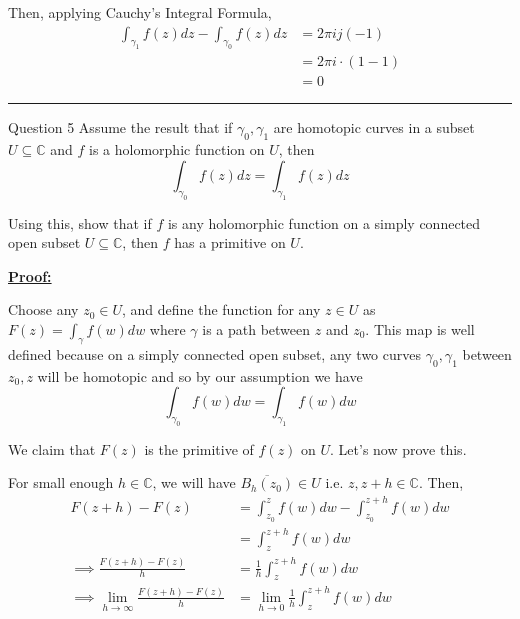 \documentclass{article}
\newcommand{\C}{\mathbb{C}}
\begin{document}
\begin{enumerate}[label=(\alph*)]
  \vskip 0.5cm
  Then, applying Cauchy's Integral Formula, 
  \begin{align*}
    \int_{{\gamma_1}} f(z) dz - \int_{{\gamma_0}} f(z) dz &= 2\pi i j(-1) \\
    &= 2\pi i \cdot \left(1-1\right) \\
    &= 0
  \end{align*}
\end{enumerate}

\vskip 0.5cm
\hrule 
\vskip 0.5cm



\begin{mathdefinitionbox}{Question 5}
\vskip 0.5cm
Assume the result that if $\gamma_0, \gamma_1$ are homotopic curves in a subset $U \subseteq \C$ and $f$ is a holomorphic function on $U$, then 
\[  \int_{{\gamma_0}} f(z)dz =  \int_{{\gamma_1}} f(z)dz \]

Using this, show that if $f$ is any holomorphic function on a simply connected open subset $U \subseteq \C$, then $f$ has a primitive on $U$.
\end{mathdefinitionbox}

\vskip 0.5cm
\underline{\textbf{Proof:}}

Choose any $z_0 \in U$, and define the function for any $z \in U$ as $F(z) = \int_{\gamma} f(w) dw$ where $\gamma$ is a path between $z$ and $z_0$. This map is well defined because on a simply connected open subset, any two curves $\gamma_0, \gamma_1$ between $z_0, z$ will be homotopic and so by our assumption we have 
\[ \int_{{\gamma_0}} f(w) dw = \int_{{\gamma_1}} f(w)dw  \]

\vskip 0.5cm
We claim that $F(z)$ is the primitive of $f(z)$ on $U$. Let's now prove this.

\vskip 0.5cm
For small enough $h \in \C$, we will have $\overline{B_h(z_0)} \in U$ i.e. $z, z+h \in \C$. Then,
\begin{align*}
  F(z+h) - F(z) &= \int_{z_0}^{z} f(w) dw - \int_{z_0}^{z+h} f(w) dw \\
  &= \int_{z}^{z+h} f(w) dw \\
  \implies \frac{F(z+h) - F(z)}{h} &= \frac{1}{h}\int_{z}^{z+h} f(w) dw  \\
  \implies \lim_{h \rightarrow \infty} \frac{F(z+h) - F(z)}{h} &= \lim_{h \rightarrow 0} \frac{1}{h} \int_{z}^{z+h} f(w) dw
\end{align*}
\end{document}
